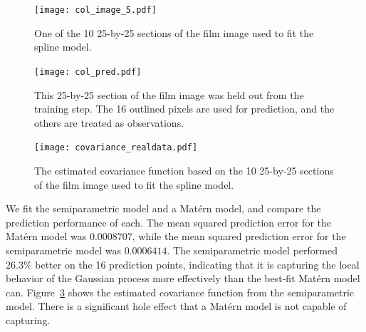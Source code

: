 \begin{figure}[htbp]
	\centering
	\texttt{[image: col\_image\_5.pdf]}
	\caption{One of the 10 25-by-25 sections of the film image used to fit the spline model.}
	\label{fig:training25}
\end{figure}

\begin{figure}[htbp]
	\centering
	\texttt{[image: col\_pred.pdf]}
	\caption{This 25-by-25 section of the film image was held out from the training step. The 16 outlined pixels are used for prediction, and the others are treated as observations.}
	\label{fig:pred25}
\end{figure}

\begin{figure}[htbp]
	\centering
	\texttt{[image: covariance\_realdata.pdf]}
	\caption{The estimated covariance function based on the 10 25-by-25 sections of the film image used to fit the spline model.}
	\label{fig:covariance-realdata}
\end{figure}

We fit the semiparametric model and a Mat\'ern model, and compare the prediction performance of each. The mean squared prediction error for the Mat\'ern model was $0.0008707$, while the mean squared prediction error for the semiparametric model was $0.0006414$. The semiparametric model performed $26.3\%$ better on the 16 prediction points, indicating that it is capturing the local behavior of the Gaussian process more effectively than the best-fit Mat\'ern model can. Figure~\ref{fig:covariance-realdata} shows the estimated covariance function from the semiparametric model. There is a significant hole effect that a Mat\'ern model is not capable of capturing.
